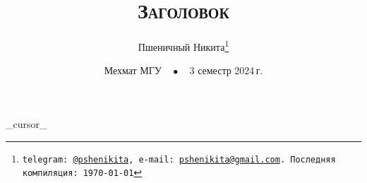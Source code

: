 \documentclass[a4paper, 11pt]{article}
\begin{document}
\title{\bfseries\scshape Заголовок}
\date{Мехмат МГУ$\quad\bullet\quad$3 семестр 2024\,г.}
\author{Пшеничный Никита\thanks{\texttt{telegram: \href{https://t.me/pshenikita}{@pshenikita}, e-mail: \href{mailto:pshenikita@gmail.com}{pshenikita@gmail.com}. Последняя компиляция: \today}}}

{{_cursor_}}
\end{document}
